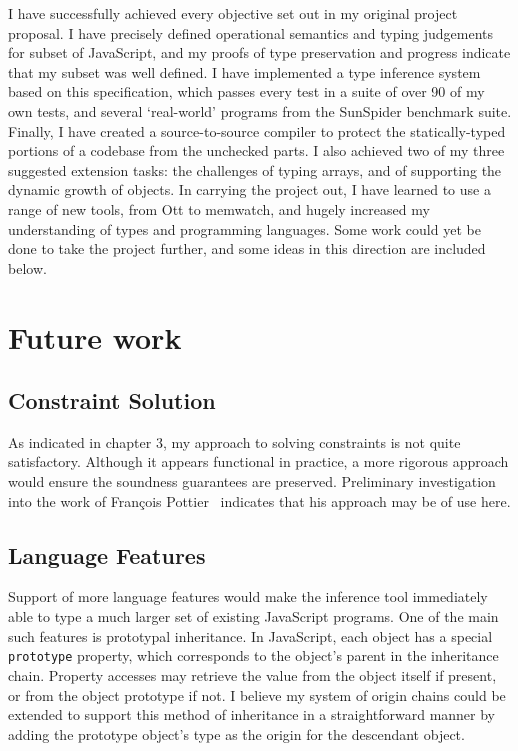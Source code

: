 \documentclass[12pt,a4paper,twoside,openright]{report}
\theoremstyle{definition}
\theoremstyle{dotless}
\newcommand*{\js}{\texttt}
\begin{document}
I have successfully achieved every objective set out in my original project
proposal.  I have precisely defined operational semantics and typing judgements
for subset of JavaScript, and my proofs of type preservation and progress
indicate that my subset was well defined.  I have implemented a type inference
system based on this specification, which passes every test in a suite of over
90 of my own tests, and several `real-world' programs from the SunSpider
benchmark suite. Finally, I have created a source-to-source compiler to
protect the statically-typed portions of a codebase from the unchecked parts. I
also achieved two of my three suggested extension tasks: the challenges of
typing arrays, and of supporting the dynamic growth of objects. In carrying the
project out, I have learned to use a range of new tools, from Ott to memwatch,
and hugely increased my understanding of types and programming languages. Some
work could yet be done to take the project further, and some ideas in this
direction are included below.

\section{Future work}

\subsection{Constraint Solution}
As indicated in chapter 3, my approach to solving constraints is not quite satisfactory. 
Although it appears functional in practice, a more rigorous approach would ensure the
soundness guarantees are preserved. Preliminary investigation into the work of
Fran\c{c}ois Pottier~\cite{pottier1998type} indicates that his approach may be of use here.

\subsection{Language Features}

Support of more language features would make the inference tool immediately
able to type a much larger set of existing JavaScript programs. One of the main
such features is prototypal inheritance. In JavaScript, each object has a
special \js{prototype} property, which corresponds to the object's parent in
the inheritance chain. Property accesses may retrieve the value from the
object itself if present, or from the object prototype if not. I believe my 
system of origin chains could be extended to support this method of inheritance 
in a straightforward manner by adding the prototype object's type as the origin
for the descendant object.
\end{document}
